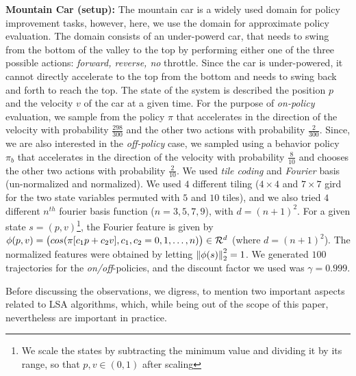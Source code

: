 \textbf{Mountain Car (setup):}  The mountain car is a widely used domain for policy improvement tasks, however, here, we use the domain for approximate policy evaluation. The domain consists of an under-powerd car, that needs to swing from the bottom of the valley to the top by performing either one of the three possible actions: \emph{forward, reverse, no} throttle. Since the car is under-powered, it cannot directly accelerate to the top from the bottom and needs to swing back and forth to reach the top. The state of the system is described the position $p$ and the velocity $v$ of the car at a given time. For the purpose of \emph{on-policy} evaluation, we sample from the policy $\pi$ that accelerates in the direction of the velocity with probability $\frac{298}{300}$ and the other two actions with probability $\frac{2}{300}$. Since, we are also interested in the \emph{off-policy} case, we sampled using a behavior policy  $\pi_b$ that accelerates in the direction of the velocity with probability $\frac{8}{10}$ and chooses the other two actions with probability $\frac{2}{10}$. We used \emph{tile coding} and \emph{Fourier} basis (un-normalized and normalized). We used $4$ different tiling ($4\times 4$ and $7\times 7$ gird for the two state variables permuted with $5$ and $10$ tiles), and we also tried $4$ different $n^{th}$ fourier basis function ($n=3,5,7,9$), with $d=(n+1)^2$. For a given state $s=(p,v)$\footnote{We scale the states by subtracting the minimum value and dividing it by its range, so that $p,v\in(0,1)$ after scaling}, the Fourier feature is given by $\phi(p,v)=\big(cos(\pi [c_1p+c_2 v],c_1,c_2=0,1,\ldots,n)\big) \in \mathcal{R}^{d}$ (where $d=(n+1)^2$). The normalized features were obtained by letting $\left\| \phi(s)\right\|^2_2=1$. We generated $100$ trajectories for the \emph{on/off}-policies, and the discount factor we used was $\gamma=0.999$. 

Before discussing the observations, we digress, to mention two important aspects related to LSA algorithms, which, while being out of the scope of this paper, nevertheless are important in practice.

